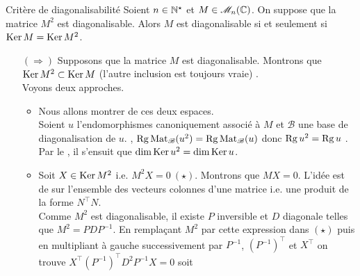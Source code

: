 \begin{prop}{Critère de diagonalisabilité}
    Soient $n \in \mathbb{N}^\star$ et $M \in \mathscr{M}_n(\mathbb{C})$. On suppose que la matrice $M^2$ est diagonalisable. Alors $M$ est diagonalisable si et seulement si $\mathrm{Ker}\, M = \mathrm{Ker}\, M^2$.
\end{prop}

\begin{preuve}
    \begin{itemize}
        \item[$(\Rightarrow)$] 
        Supposons que la matrice $M$ est diagonalisable. Montrons que $\mathrm{Ker}\, M^2 \subset \mathrm{Ker}\, M$ (l'autre inclusion est toujours vraie) \note . \\
        Voyons deux approches.
        \begin{itemize}
            \item Nous allons montrer  de ces deux espaces. \\
            Soient $u$ l'endomorphismes canoniquement associé à $M$ et $\mathscr{B}$ une base de diagonalisation de $u$. , $\mathrm{Rg}\, \mathrm{Mat}_\mathscr{B}(u^2) = \mathrm{Rg}\,  \mathrm{Mat}_\mathscr{B}(u)$ donc $\mathrm{Rg}\, u^2 = \mathrm{Rg}\, u$ \note.
            Par le , il s'ensuit que $\dim \mathrm{Ker}\, u^2 = \dim \mathrm{Ker}\, u$.
            \item Soit $X \in \mathrm{Ker}\, M^2$ i.e. $M^2 X = 0\ (\star)$. Montrons que $MX = 0$. L'idée est de  sur l'ensemble des vecteurs colonnes d'une matrice i.e. une produit de la forme $N^\top N$. \\
            Comme $M^2$ est diagonalisable, il existe $P$ inversible et $D$ diagonale telles que $M^2 = PDP^{-1}$. En remplaçant $M^2$ par cette expression dans $(\star)$ puis en multipliant à gauche successivement par $P^{-1}$,  $(P^{-1})^\top$ et $X^\top$ on trouve $X^\top (P^{-1})^\top D^2 P^{-1} X = 0$ soit 

\end{itemize}
\end{itemize}
\end{preuve}
